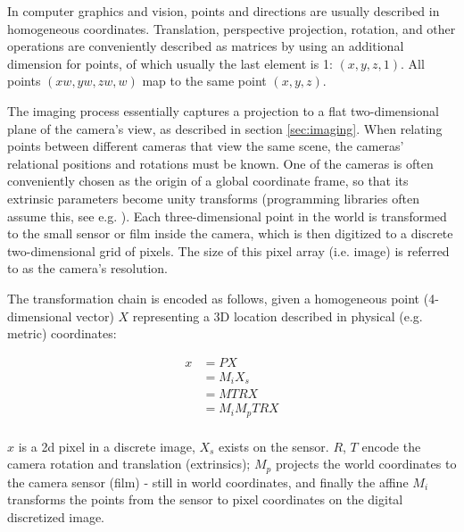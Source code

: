 In computer graphics and vision, points and directions are usually described in homogeneous coordinates.
Translation, perspective projection, rotation, and other operations are conveniently described as matrices by using an additional dimension for points, of which usually the last element is 1: $(x, y, z, 1)$.
All points $(xw, yw, zw, w)$ map to the same point $(x, y, z)$.
\cite{dubrofsky2009homography,hartley03multiview}


The imaging process essentially captures a projection to a flat two-dimensional plane of the camera's view, as described in section \ref{sec:imaging}.
When relating points between different cameras that view the same scene, the cameras' relational positions and rotations must be known.
One of the cameras is often conveniently chosen as the origin of a global coordinate frame, so that its extrinsic parameters become unity transforms (programming libraries often assume this, see e.g. \cite{opencv}).
Each three-dimensional point in the world is transformed to the small sensor or film inside the camera, which is then digitized to a discrete two-dimensional grid of pixels. The size of this pixel array (i.e. image) is referred to as the camera's resolution.


The transformation chain is encoded as follows, given a homogeneous point (4-dimensional vector) $X$ representing a 3D location described in physical (e.g. metric) coordinates:

\begin{align}
	x &= P X\\
	  &= M_i X_s\\ %
	  &= M T R X\\
	  &= M_i M_p T R X\\ %
\end{align}

$x$ is a 2d pixel in a discrete image, $X_s$ exists on the sensor. $R$, $T$ encode the camera rotation and translation (extrinsics); $M_p$ projects the world coordinates to the camera sensor (film) - still in world coordinates, and finally the affine $M_i$ transforms the points from the sensor to pixel coordinates on the digital discretized image.

